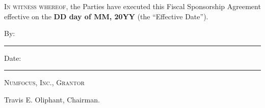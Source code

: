 \documentclass[english,letterpaper,12pt]{article}
\newcommand{\agreementdate}{\textbf{DD day of MM, 20YY}}
\begin{document}
\medskip{}

\textsc{In witness whereof}, the Parties have executed this Fiscal
Sponsorship Agreement effective on the \agreementdate{} (the
``Effective Date'').

\vspace{3em}


By: \hspace{0.95em}\rule{0.50\textwidth}{0.2mm} \hfill{}Date: \rule{0.25\textwidth}{0.2mm}

\hspace{2.5em} \textsc{Numfocus, Inc., Grantor}

\hspace{2.5em} Travis E. Oliphant, Chairman.  \\[6ex]

\vspace{2ex}


\end{document}
